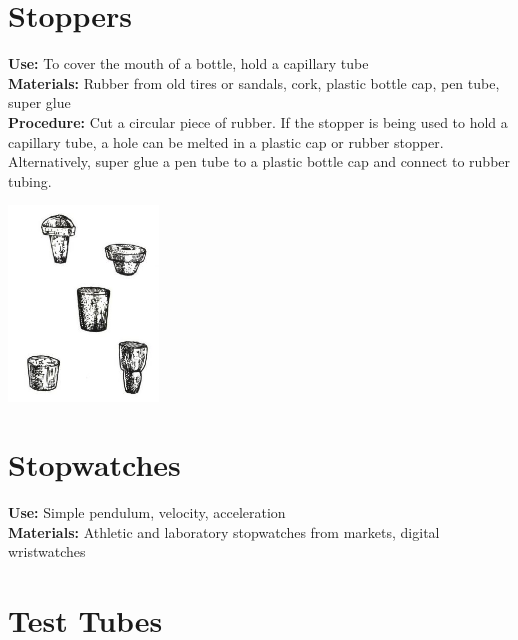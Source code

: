 \begin{multicols}{2}
\section{Stoppers}
\label{sec:stoppers}
\vspace{-10pt}
\textbf{Use:} To cover the mouth of a bottle, hold a capillary tube\\
\textbf{Materials:} Rubber from old tires or sandals, cork, plastic bottle cap, pen tube, super glue\\
\textbf{Procedure:} Cut a circular piece of rubber.  If the stopper is being used to hold a capillary tube, a hole can be melted in a plastic cap or rubber stopper. Alternatively, super glue a pen tube to a plastic bottle cap and connect to rubber tubing.
\begin{center}
\includegraphics[width=0.3\textwidth]{./img/source/stoppers.jpg}
\end{center}

\section{Stopwatches}
\label{sec:stopwatches}
\vspace{-10pt}
\textbf{Use:} Simple pendulum, velocity, acceleration\\
\textbf{Materials:} Athletic and laboratory stopwatches from markets, digital wristwatches

\section{Test Tubes}
\label{sec:testtubes}


\end{multicols}
